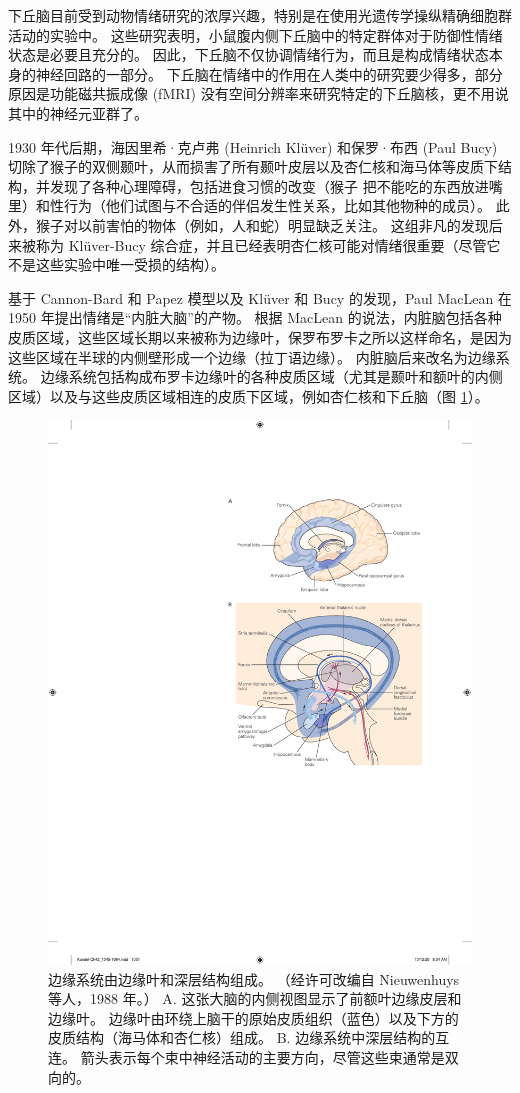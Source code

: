 下丘脑目前受到动物情绪研究的浓厚兴趣，特别是在使用光遗传学操纵精确细胞群活动的实验中。 这些研究表明，小鼠腹内侧下丘脑中的特定群体对于防御性情绪状态是必要且充分的。 因此，下丘脑不仅协调情绪行为，而且是构成情绪状态本身的神经回路的一部分。 下丘脑在情绪中的作用在人类中的研究要少得多，部分原因是功能磁共振成像 (fMRI) 没有空间分辨率来研究特定的下丘脑核，更不用说其中的神经元亚群了。

1930 年代后期，海因里希·克卢弗 (Heinrich Klüver) 和保罗·布西 (Paul Bucy) 切除了猴子的双侧颞叶，从而损害了所有颞叶皮层以及杏仁核和海马体等皮质下结构，并发现了各种心理障碍，包括进食习惯的改变（猴子 把不能吃的东西放进嘴里）和性行为（他们试图与不合适的伴侣发生性关系，比如其他物种的成员）。 此外，猴子对以前害怕的物体（例如，人和蛇）明显缺乏关注。 这组非凡的发现后来被称为 Klüver-Bucy 综合症，并且已经表明杏仁核可能对情绪很重要（尽管它不是这些实验中唯一受损的结构）。

基于 Cannon-Bard 和 Papez 模型以及 Klüver 和 Bucy 的发现，Paul MacLean 在 1950 年提出情绪是“内脏大脑”的产物。 根据 MacLean 的说法，内脏脑包括各种皮质区域，这些区域长期以来被称为边缘叶，保罗布罗卡之所以这样命名，是因为这些区域在半球的内侧壁形成一个边缘（拉丁语边缘）。 
内脏脑后来改名为边缘系统。 边缘系统包括构成布罗卡边缘叶的各种皮质区域（尤其是颞叶和额叶的内侧区域）以及与这些皮质区域相连的皮质下区域，例如杏仁核和下丘脑（图 \ref{fig:42_4}）。

\begin{figure}[htbp]
	\centering
	\includegraphics[width=0.6\linewidth]{chap42/fig_42_4}
	\caption{边缘系统由边缘叶和深层结构组成。 （经许可改编自 Nieuwenhuys 等人，1988 年。） A. 这张大脑的内侧视图显示了前额叶边缘皮层和边缘叶。 边缘叶由环绕上脑干的原始皮质组织（蓝色）以及下方的皮质结构（海马体和杏仁核）组成。 B. 边缘系统中深层结构的互连。 箭头表示每个束中神经活动的主要方向，尽管这些束通常是双向的。}
	\label{fig:42_4}
\end{figure}

